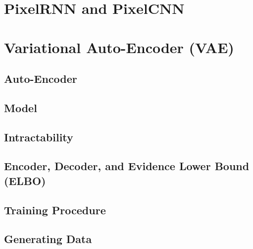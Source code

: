 	\section{PixelRNN and PixelCNN} %

	\section{Variational Auto-Encoder (VAE)} %
		\label{sec:vae}


		\subsection{Auto-Encoder} %

		\subsection{Model} %

		\subsection{Intractability} %

		\subsection{Encoder, Decoder, and Evidence Lower Bound (ELBO)} %

		\subsection{Training Procedure} %

		\subsection{Generating Data} %

